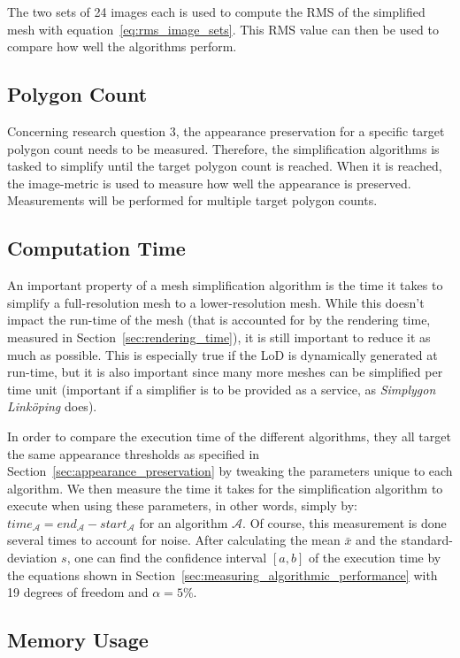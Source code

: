 The two sets of 24 images each is used to compute the RMS of the simplified mesh with equation~\ref{eq:rms_image_sets}. This RMS value can then be used to compare how well the algorithms perform. 
\subsection{Polygon Count} \label{sec:polygon_count}
Concerning research question 3, the appearance preservation for a specific target polygon count needs to be measured. Therefore, the simplification algorithms is tasked to simplify until the target polygon count is reached. When it is reached, the image-metric is used to measure how well the appearance is preserved. Measurements will be performed for multiple target polygon counts. 

\subsection{Computation Time} \label{sec:computation_time}

An important property of a mesh simplification algorithm is the time it takes to simplify a full-resolution mesh to a lower-resolution mesh. While this doesn't impact the run-time of the mesh (that is accounted for by the rendering time, measured in Section~\ref{sec:rendering_time}), it is still important to reduce it as much as possible. This is especially true if the LoD is dynamically generated at run-time, but it is also important since many more meshes can be simplified per time unit (important if a simplifier is to be provided as a service, as \emph{Simplygon Linköping} does).

In order to compare the execution time of the different algorithms, they all target the same appearance thresholds as specified in Section~\ref{sec:appearance_preservation} by tweaking the parameters unique to each algorithm. We then measure the time it takes for the simplification algorithm to execute when using these parameters, in other words, simply by: \(time_\mathcal{A} = end_\mathcal{A} - start_\mathcal{A}\) for an algorithm \(\mathcal{A}\). Of course, this measurement is done several times to account for noise. After calculating the mean \(\bar{x}\) and the standard-deviation \(s\), one can find the confidence interval \([a, b]\) of the execution time by the equations shown in Section~\ref{sec:measuring_algorithmic_performance} with 19 degrees of freedom and \(\alpha = 5 \%\).

\subsection{Memory Usage} \label{sec:memory_usage}

